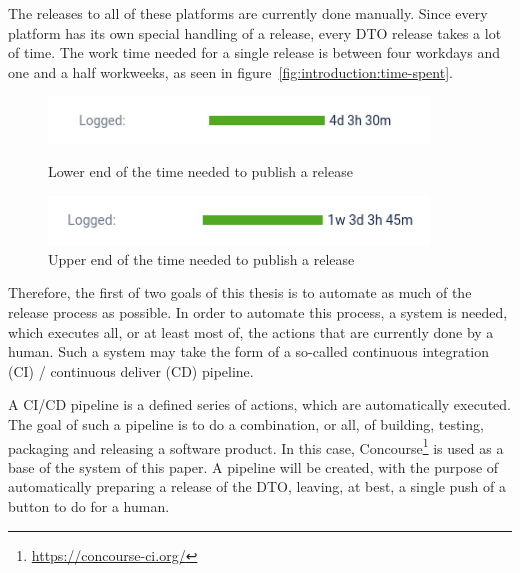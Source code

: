 The releases to all of these platforms are currently done manually.
Since every platform has its own special handling of a release, every DTO release takes a lot of time.
The work time needed for a single release is between four workdays and one and a half workweeks, as seen in figure\ \ref{fig:introduction:time-spent}.

\begin{figure}
    \label{fig:introduction:time-spent}
    \centering
    \begin{minipage}{0.45\textwidth}
        \centering
        \includegraphics[width=0.9\textwidth]{img/introduction/lower_end}
        \caption{Lower end of the time needed to publish a release}
        \label{fig:introduction:lower-end}
    \end{minipage}\hfill
    \begin{minipage}{0.45\textwidth}
        \centering
        \includegraphics[width=0.9\textwidth]{img/introduction/upper_end}
        \caption{Upper end of the time needed to publish a release}
        \label{fig:introduction:upper-end}
    \end{minipage}
\end{figure}

Therefore, the first of two goals of this thesis is to automate as much of the release process as possible.
In order to automate this process, a system is needed, which executes all, or at least most of, the actions that are currently done by a human.
Such a system may take the form of a so-called continuous integration (CI) / continuous deliver (CD)  pipeline.

A CI/CD pipeline is a defined series of actions, which are automatically executed\cite{WhatIsACiCdPipeline}.
The goal of such a pipeline is to do a combination, or all, of building, testing, packaging and releasing a software product\cite{WhatIsACiCdPipeline}.
In this case, Concourse\footnote{\url{https://concourse-ci.org/}} is used as a base of the system of this paper.
A pipeline will be created, with the purpose of automatically preparing a release of the DTO, leaving, at best, a single push of a button to do for a human.


